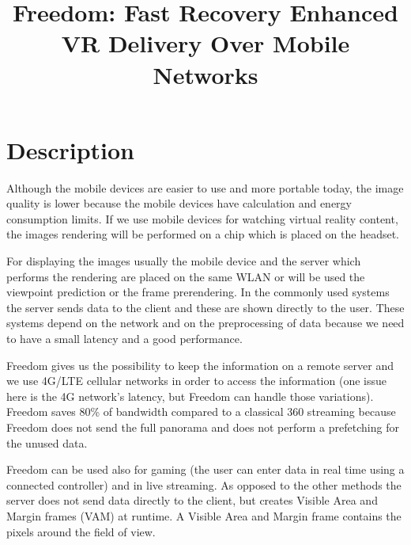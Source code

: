 \documentclass[conference]{IEEEtran}
\begin{document}
\title{Freedom: Fast Recovery Enhanced VR Delivery Over Mobile Networks\\
}

\author{\IEEEauthorblockN{}
\IEEEauthorblockA{\textit{} \\
}
\and
{}
\and
\IEEEauthorblockN{}
\IEEEauthorblockA{\textit{} \\
}
}

\maketitle

\section*{Description}
Although the mobile devices are easier to use and more portable today, the image quality is lower because the mobile devices have calculation and energy consumption limits. If we use mobile devices for watching virtual reality content, the images rendering will be performed on a chip which is placed on the headset.

For displaying the images usually the mobile device and the server which performs the rendering are placed on the same WLAN or will be used the viewpoint prediction or the frame prerendering. In the commonly used systems the server sends data to the client and these are shown directly to the user. These systems depend on the network and on the preprocessing of data because we need to have a small latency and a good performance. 

Freedom gives us the possibility to keep the information on a remote server and we use 4G/LTE cellular networks in order to access the information (one issue here is the 4G network's latency, but Freedom can handle those variations). Freedom saves 80\% of bandwidth compared to a classical 360 streaming because Freedom does not send the full panorama and does not perform a prefetching for the unused data.

Freedom can be used also for gaming (the user can enter data in real time using a connected controller) and in live streaming. As opposed to the other methods the server does not send data directly to the client, but creates Visible Area and Margin frames (VAM) at runtime. A Visible Area and Margin frame contains the pixels around the field of view. 
\end{document}
